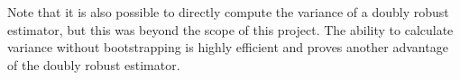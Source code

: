 Note that it is also possible to directly compute the variance of a doubly robust estimator, but this was beyond the scope of this project.  The ability to calculate variance without bootstrapping is highly efficient and proves another advantage of the doubly robust estimator.  


